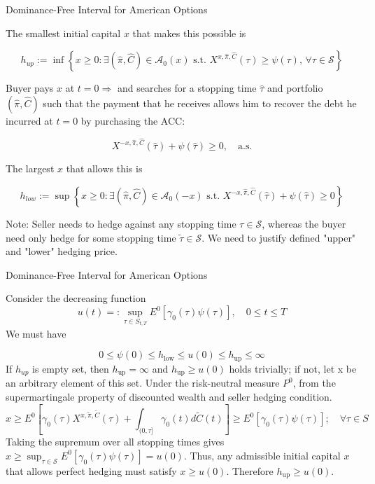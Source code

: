 \documentclass{beamer}
\begin{document}
\begin{frame}{Dominance-Free Interval for American Options}

    {\footnotesize \footnotesize
    The smallest initial capital \(x\) that makes this possible is

    \[
    h_{up} := \inf \left\{ x \geq 0 : \exists (\hat{\pi}, \hat{C}) \in \mathcal{A}_0(x) \text{ s.t. }
     X^{x,\hat{\pi},\hat{C}}(\tau) \geq \psi(\tau), \, \forall \tau \in \mathcal{S} \right\}
    \]

    Buyer pays \(x\) at \(t = 0 \Rightarrow\) and searches for a stopping time \(\hat{\tau}\) 
    and portfolio \((\hat{\pi}, \hat{C})\) such that the payment that he receives allows him to recover
    the debt he incurred at $t=0$ by purchasing the ACC:

    \[
    X^{-x,\hat{\pi},\hat{C}}(\hat{\tau}) + \psi(\hat{\tau}) \geq 0, \quad \text{a.s.}
    \]

    The largest \(x\) that allows this is

    \[
    h_{low} := \sup \left\{ x \geq 0 : \exists (\hat{\pi}, \hat{C}) \in \mathcal{A}_0(-x) \text{ s.t. } 
    X^{-x,\hat{\pi},\hat{C}}(\hat{\tau}) + \psi(\hat{\tau}) \geq 0 \right\}
    \]
    \par Note: Seller needs to hedge against any stopping time \(\tau \in \mathcal{S}\), 
    whereas the buyer need only hedge for some stopping time \(\tilde{\tau} \in \mathcal{S}\). We need to justify
    defined "upper" and "lower" hedging price.
    }
\end{frame} 
\begin{frame}{Dominance-Free Interval for American Options}

    {\footnotesize \footnotesize
    Consider the decreasing function
\[
u(t) =: \sup_{\tau \in S_{t,T}} E^0[\gamma_0(\tau)\psi(\tau)], \quad 0 \leq t \leq T
\]
We must have

\[
0 \leq \psi(0) \leq h_{\text{low}} \leq u(0) \leq h_{\text{up}} \leq \infty
\]
If $h_{up}$ is empty set, then $h_{\text{up}} = \infty$ and $h_{\text{up}} \geq u(0)$ holds trivially; if not,
let x be an arbitrary element of this set. Under the risk-neutral measure \( P^0 \), 
from the supermartingale property of discounted wealth and seller hedging condition.
\[
x \geq E^0 \left[ \gamma_0(\tau)X^{x,\tilde{\pi},\tilde{C}}(\tau) + \int_{(0,\tau]} 
\gamma_0(t)d\tilde{C}(t) \right] \geq E^0[\gamma_0(\tau)\psi(\tau)]; \quad \forall \tau \in S
\]
Taking the supremum over all stopping times gives $x \geq \sup_{\tau \in \mathcal{S}} E^0 [\gamma_0(\tau) \psi(\tau)] = u(0).$
Thus, any admissible initial capital \( x \) that allows perfect hedging must satisfy \( x \geq u(0) \). 
Therefore $h_{\text{up}} \geq u(0).$
    }
\end{frame} 
\end{document}
